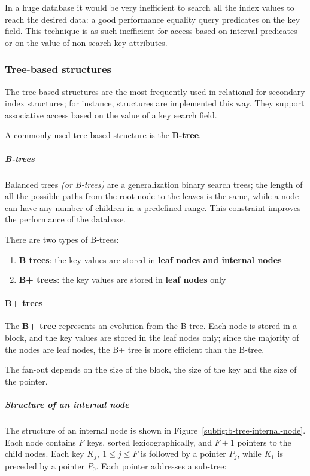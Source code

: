 \documentclass[english]{article}
\begin{document}
In a huge database it would be very inefficient to search all the index values to reach the desired data:
a good performance equality query predicates on the key field.
This technique is as such inefficient for access based on interval predicates or on the value of non search-key attributes.

\subsubsection{Tree-based structures}

The tree-based structures are the most frequently used in relational \dbms for secondary index structures;
for instance, \sql structures are implemented this way.
They support associative access based on the value of a key search field.

A commonly used tree-based structure is the \textbf{B-tree}.

\subparagraph*{B-trees}
Balanced trees \textit{(or B-trees)} are a generalization binary search trees;
the length of all the possible paths from the root node to the leaves is the same, while a node can have any number of children in a predefined range.
This constraint improves the performance of the database.

There are two types of B-trees:

\begin{enumerate}
  \item \textbf{B trees}: the key values are stored in \textbf{leaf nodes and internal nodes}
  \item \textbf{B+ trees}: the key values are stored in \textbf{leaf nodes} only
\end{enumerate}

\paragraph{B+ trees}

The \textbf{B+ tree} represents an evolution from the B-tree.
Each node is stored in a block, and the key values are stored in the leaf nodes only;
since the majority of the nodes are leaf nodes, the B+ tree is more efficient than the B-tree.

The fan-out depends on the size of the block, the size of the key and the size of the pointer.

\subparagraph*{Structure of an internal node}
The structure of an internal node is shown in Figure~\ref{subfig:b-tree-internal-node}.
Each node contains \(F\) keys, sorted lexicographically, and \(F + 1\) pointers to the child nodes.
Each key \(K_j, \ 1 \leq j \leq F\) is followed by a pointer \(P_j\), while \(K_1\) is preceded by a pointer \(P_0\).
Each pointer addresses a sub-tree:
\end{document}
